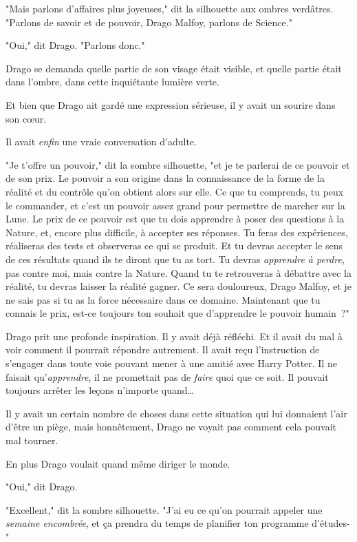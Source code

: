 "Mais parlons d'affaires plus joyeuses," dit la silhouette aux ombres verdâtres. "Parlons de savoir et de pouvoir, Drago Malfoy, parlons de Science."

"Oui," dit Drago. "Parlons donc."

Drago se demanda quelle partie de son visage était visible, et quelle partie était dans l'ombre, dans cette inquiétante lumière verte.

Et bien que Drago ait gardé une expression sérieuse, il y avait un sourire dans son cœur.

Il avait \emph{enfin} une vraie conversation d'adulte.

"Je t'offre un pouvoir," dit la sombre silhouette, "et je te parlerai de ce pouvoir et de son prix. Le pouvoir a son origine dans la connaissance de la forme de la réalité et du contrôle qu'on obtient alors sur elle. Ce que tu comprends, tu peux le commander, et c'est un pouvoir assez grand pour permettre de marcher sur la Lune. Le prix de ce pouvoir est que tu dois apprendre à poser des questions à la Nature, et, encore plus difficile, à accepter ses réponses. Tu feras des expériences, réaliseras des tests et observeras ce qui se produit. Et tu devras accepter le sens de ces résultats quand ils te diront que tu as tort. Tu devras \emph{apprendre à perdre}, pas contre moi, mais contre la Nature. Quand tu te retrouveras à débattre avec la réalité, tu devras laisser la réalité gagner. Ce sera douloureux, Drago Malfoy, et je ne sais pas si tu as la force nécessaire dans ce domaine. Maintenant que tu connais le prix, est-ce toujours ton souhait que d'apprendre le pouvoir humain~?"

Drago prit une profonde inspiration. Il y avait déjà réfléchi. Et il avait du mal à voir comment il pourrait répondre autrement. Il avait reçu l'instruction de s'engager dans toute voie pouvant mener à une amitié avec Harry Potter. Il ne faisait qu'\emph{apprendre}, il ne promettait pas de \emph{faire} quoi que ce soit. Il pouvait toujours arrêter les leçons n'importe quand…

Il y avait un certain nombre de choses dans cette situation qui lui donnaient l'air d'être un piège, mais honnêtement, Drago ne voyait pas comment cela pouvait mal tourner.

En plus Drago voulait quand même diriger le monde.

"Oui," dit Drago.

"Excellent," dit la sombre silhouette. "J'ai eu ce qu'on pourrait appeler une \emph{semaine encombrée}, et ça prendra du temps de planifier ton programme d'études-"

